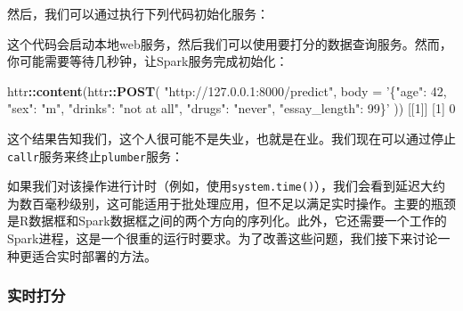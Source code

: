 \documentclass[
]{article}
\newenvironment{Shaded}{\begin{snugshade}}{\end{snugshade}}
\newcommand{\ControlFlowTok}[1]{\textcolor[rgb]{0.13,0.29,0.53}{\textbf{#1}}}
\newcommand{\DataTypeTok}[1]{\textcolor[rgb]{0.13,0.29,0.53}{#1}}
\newcommand{\DecValTok}[1]{\textcolor[rgb]{0.00,0.00,0.81}{#1}}
\newcommand{\KeywordTok}[1]{\textcolor[rgb]{0.13,0.29,0.53}{\textbf{#1}}}
\newcommand{\NormalTok}[1]{#1}
\newcommand{\OperatorTok}[1]{\textcolor[rgb]{0.81,0.36,0.00}{\textbf{#1}}}
\newcommand{\StringTok}[1]{\textcolor[rgb]{0.31,0.60,0.02}{#1}}
\begin{document}
然后，我们可以通过执行下列代码初始化服务：

\begin{Shaded}
\end{Shaded}

这个代码会启动本地web服务，然后我们可以使用要打分的数据查询服务。然而，你可能需要等待几秒钟，让Spark服务完成初始化：

\begin{Shaded}
\begin{Highlighting}[]
\NormalTok{httr}\OperatorTok{::}\KeywordTok{content}\NormalTok{(httr}\OperatorTok{::}\KeywordTok{POST}\NormalTok{(}
\StringTok{"http://127.0.0.1:8000/predict"}\NormalTok{,}
\DataTypeTok{body =} \StringTok{'\{"age": 42, "sex": "m", "drinks": "not at all",}
\StringTok{ "drugs": "never", "essay_length": 99\}'}
\NormalTok{))}
\NormalTok{[[}\DecValTok{1}\NormalTok{]]}
\NormalTok{[}\DecValTok{1}\NormalTok{] }\DecValTok{0}
\end{Highlighting}
\end{Shaded}

这个结果告知我们，这个人很可能不是失业，也就是在业。我们现在可以通过停止\texttt{callr}服务来终止\texttt{plumber}服务：

\begin{Shaded}
\end{Shaded}

如果我们对该操作进行计时（例如，使用\texttt{system.time()}），我们会看到延迟大约为数百毫秒级别，这可能适用于批处理应用，但不足以满足实时操作。主要的瓶颈是R数据框和Spark数据框之间的两个方向的序列化。此外，它还需要一个工作的Spark进程，这是一个很重的运行时要求。为了改善这些问题，我们接下来讨论一种更适合实时部署的方法。

\hypertarget{ux5b9eux65f6ux6253ux5206}{%
\subsubsection{实时打分}\label{ux5b9eux65f6ux6253ux5206}}
\end{document}
